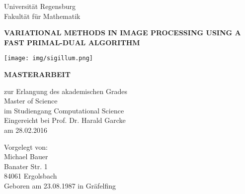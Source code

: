 
\begin{titlepage} %

    \begin{center}
        \begin{Large}
            Universit\"at Regensburg\\
            Fakult\"at f\"ur Mathematik\\
        \end{Large}
        \vspace{1cm}
        \begin{Large}
            \textbf{VARIATIONAL METHODS IN IMAGE PROCESSING USING A FAST PRIMAL-DUAL ALGORITHM}
        \end{Large}
        \vspace{1cm}
        \begin{center}
        \texttt{[image: img/sigillum.png]}
        \vspace{1cm}\\
        \begin{Large}
            \textbf{MASTERARBEIT}\\
        \end{Large}
        \vspace{0.5cm}
        \begin{large}
            zur Erlangung des akademischen Grades\\
            Master of Science\\
            im Studiengang Computational Science\\
            \vspace{0.5cm}
            Eingereicht bei Prof. Dr. Harald Garcke\\
            am 28.02.2016
        \end{large}
        \vspace{0.5cm}
    \end{center}

    \begin{flushleft}
        \begin{large}
            Vorgelegt von:\\
            Michael Bauer\\
            Banater Str. 1\\
            84061 Ergolsbach\\
            Geboren am 23.08.1987 in Gr\"afelfing
        \end{large}
    \end{flushleft}

    \end{center}

\end{titlepage}

\newpage